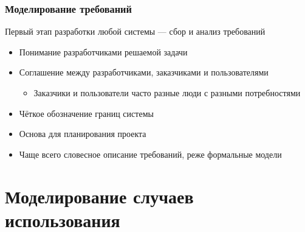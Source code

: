 \documentclass[xetex,mathserif,serif]{beamer}
\begin{document}
    \begin{frame}
        \frametitle{Моделирование требований}
        Первый этап разработки любой системы --- сбор и анализ требований
        \begin{itemize}
            \item Понимание разработчиками решаемой задачи
            \item Соглашение между разработчиками, заказчиками и пользователями
            \begin{itemize}
                \item Заказчики и пользователи часто разные люди с разными потребностями
            \end{itemize}
            \item Чёткое обозначение границ системы
            \item Основа для планирования проекта
            \item Чаще всего словесное описание требований, реже формальные модели
        \end{itemize}
    \end{frame}

    \section{Моделирование случаев использования}
    
\end{document}
